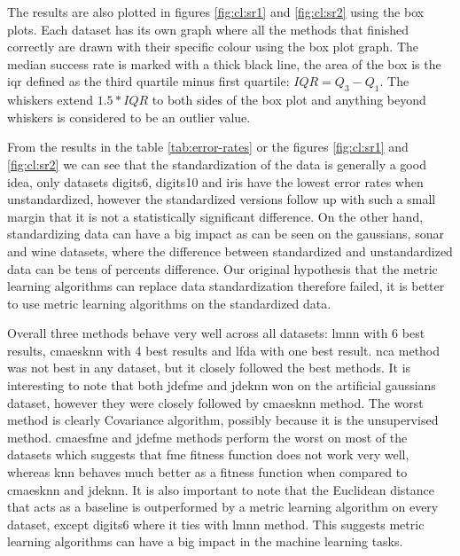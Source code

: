 \documentclass[12pt,a4paper]{report}
\begin{document}


The results are also plotted in figures \ref{fig:cl:sr1} and \ref{fig:cl:sr2} using the box plots. Each dataset has its own graph where all the methods that finished correctly are drawn with their specific colour using the box plot graph. The median success rate is marked with a thick black line, the area of the box is the \ac{iqr} defined as the third quartile minus first quartile: $IQR = Q_3 - Q_1$. The whiskers extend $1.5*IQR$ to both sides of the box plot and anything beyond whiskers is considered to be an outlier value.


From the results in the table \ref{tab:error-rates} or the figures \ref{fig:cl:sr1} and \ref{fig:cl:sr2} we can see that the standardization of the data is generally a good idea, only datasets digits6, digits10 and iris have the lowest error rates when unstandardized, however the standardized versions follow up with such a small margin that it is not a statistically significant difference. On the other hand, standardizing data can have a big impact as can be seen on the gaussians, sonar and wine datasets, where the difference between standardized and unstandardized data can be tens of percents difference. Our original hypothesis that the metric learning algorithms can replace data standardization therefore failed, it is better to use metric learning algorithms on the standardized data.

Overall three methods behave very well across all datasets: \ac{lmnn} with 6 best results, \ac{cmaesknn} with 4 best results and \ac{lfda} with one best result. \ac{nca} method was not best in any dataset, but it closely followed the best methods. It is interesting to note that both \ac{jdefme} and \ac{jdeknn} won on the artificial gaussians dataset, however they were closely followed by \ac{cmaesknn} method. The worst method is clearly Covariance algorithm, possibly because it is the unsupervised method. \ac{cmaesfme} and \ac{jdefme} methods perform the worst on most of the datasets which suggests that \ac{fme} fitness function does not work very well, whereas \ac{knn} behaves much better as a fitness function when compared to \ac{cmaesknn} and \ac{jdeknn}. It is also important to note that the Euclidean distance that acts as a baseline is outperformed by a metric learning algorithm on every dataset, except digits6 where it ties with \ac{lmnn} method. This suggests metric learning algorithms can have a big impact in the machine learning tasks.
\end{document}
